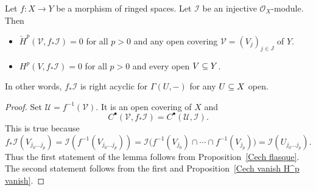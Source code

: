 \begin{proposition}\label{push injective}
Let $f:X\to Y$ be a morphism of ringed spaces. Let $\mathscr{I}$ be an injective $\mathscr{O}_X$-module. Then
\begin{itemize}
\item $\check{H}^p(\mathcal{V},f_*\mathscr{I})=0$ for all $p>0$ and any open covering $\mathcal{V}=(V_j)_{j\in J}$ of $Y$.
\item $H^p(V,f_*\mathscr{I})=0$ for all $p>0$ and every open $V\subseteq Y$.
\end{itemize}
In other words, $f_*\mathscr{I}$ is right acyclic for $\Gamma(U,-)$ for any $U\subseteq X$ open.
\end{proposition}
\begin{proof}
Set $\mathcal{U}=f^{-1}(\mathcal{V})$. It is an open covering of $X$ and
\[C^\bullet(\mathcal{V},f_*\mathscr{I})=C^\bullet(\mathcal{U},\mathscr{I}).\]
This is true because
\[f_*\mathscr{I}(V_{j_0\dots j_p})=\mathscr{I}(f^{-1}(V_{j_0\dots j_p}))=\mathscr{I}\big(f^{-1}(V_{j_0})\cap\cdots\cap f^{-1}(V_{j_p})\big)=\mathscr{I}(U_{j_0\dots j_p}).\]
Thus the first statement of the lemma follows from Proposition~\ref{Cech flasque}. The second statement follows from the first and Proposition~\ref{Cech vanish H^p vanish}.
\end{proof}